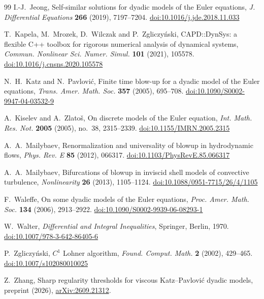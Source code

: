 \documentclass[12pt,reqno]{amsart}
\numberwithin{equation}{section}
\theoremstyle{plain}
\theoremstyle{definition}
\theoremstyle{remark}
\begin{document}
\begin{thebibliography}{99}
 I.-J.~Jeong, Self-similar solutions for dyadic models of
the Euler equations, \emph{J. Differential Equations} \textbf{266} (2019),
7197--7204.
\href{https://doi.org/10.1016/j.jde.2018.11.033}{doi:10.1016/j.jde.2018.11.033}

 T.~Kapela, M.~Mrozek, D.~Wilczak and P.~Zgliczy\'nski,
CAPD::DynSys: a flexible C++ toolbox for rigorous numerical analysis of
dynamical systems, \emph{Commun. Nonlinear Sci. Numer. Simul.}
\textbf{101} (2021), 105578.
\href{https://doi.org/10.1016/j.cnsns.2020.105578}{doi:10.1016/j.cnsns.2020.105578}

 N.~H.~Katz and N.~Pavlovi\'c, Finite time blow-up for a
dyadic model of the Euler equations, \emph{Trans. Amer. Math. Soc.}
\textbf{357} (2005), 695--708.
\href{https://doi.org/10.1090/S0002-9947-04-03532-9}{doi:10.1090/S0002-9947-04-03532-9}

 A.~Kiselev and A.~Zlato\v{s}, On discrete models of the
Euler equation, \emph{Int. Math. Res. Not.} \textbf{2005} (2005), no.~38,
2315--2339.
\href{https://doi.org/10.1155/IMRN.2005.2315}{doi:10.1155/IMRN.2005.2315}

 A.~A.~Mailybaev, Renormalization and universality of
blowup in hydrodynamic flows, \emph{Phys. Rev. E} \textbf{85} (2012),
066317.
\href{https://doi.org/10.1103/PhysRevE.85.066317}{doi:10.1103/PhysRevE.85.066317}

 A.~A.~Mailybaev, Bifurcations of blowup in inviscid shell
models of convective turbulence, \emph{Nonlinearity} \textbf{26} (2013),
1105--1124.
\href{https://doi.org/10.1088/0951-7715/26/4/1105}{doi:10.1088/0951-7715/26/4/1105}

 F.~Waleffe, On some dyadic models of the Euler equations,
\emph{Proc. Amer. Math. Soc.} \textbf{134} (2006), 2913--2922.
\href{https://doi.org/10.1090/S0002-9939-06-08293-1}{doi:10.1090/S0002-9939-06-08293-1}

 W.~Walter, \emph{Differential and Integral Inequalities},
Springer, Berlin, 1970.
\href{https://doi.org/10.1007/978-3-642-86405-6}{doi:10.1007/978-3-642-86405-6}

 P.~Zgliczy\'nski, $C^1$ Lohner algorithm, \emph{Found.
Comput. Math.} \textbf{2} (2002), 429--465.
\href{https://doi.org/10.1007/s102080010025}{doi:10.1007/s102080010025}

 Z.~Zhang, Sharp regularity thresholds for viscous
Katz--Pavlovi\'c dyadic models, preprint (2026),
\href{https://arxiv.org/abs/2609.21312}{arXiv:2609.21312}.

\end{thebibliography}
\end{document}
